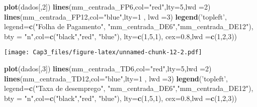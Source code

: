 \documentclass[]{article}
\newenvironment{Shaded}{\begin{snugshade}}{\end{snugshade}}
\newcommand{\DataTypeTok}[1]{\textcolor[rgb]{0.13,0.29,0.53}{#1}}
\newcommand{\DecValTok}[1]{\textcolor[rgb]{0.00,0.00,0.81}{#1}}
\newcommand{\FloatTok}[1]{\textcolor[rgb]{0.00,0.00,0.81}{#1}}
\newcommand{\KeywordTok}[1]{\textcolor[rgb]{0.13,0.29,0.53}{\textbf{#1}}}
\newcommand{\NormalTok}[1]{#1}
\newcommand{\StringTok}[1]{\textcolor[rgb]{0.31,0.60,0.02}{#1}}
\begin{document}
\begin{Shaded}
\begin{Highlighting}[]
\KeywordTok{plot}\NormalTok{(dados[,}\DecValTok{2}\NormalTok{])}
\KeywordTok{lines}\NormalTok{(mm_centrada_FP6,}\DataTypeTok{col=}\StringTok{"red"}\NormalTok{,}\DataTypeTok{lty=}\DecValTok{5}\NormalTok{,}\DataTypeTok{lwd =}\DecValTok{2}\NormalTok{)}
\KeywordTok{lines}\NormalTok{(mm_centrada_FP12,}\DataTypeTok{col=}\StringTok{"blue"}\NormalTok{,}\DataTypeTok{lty=}\DecValTok{1}\NormalTok{ , }\DataTypeTok{lwd =}\DecValTok{3}\NormalTok{)}
\KeywordTok{legend}\NormalTok{(}\StringTok{'topleft'}\NormalTok{, }\DataTypeTok{legend=}\KeywordTok{c}\NormalTok{(}\StringTok{"Folha de Pagamento"}\NormalTok{, }\StringTok{"mm_centrada_DE6"}\NormalTok{,}\StringTok{"mm_centrada_DE12"}\NormalTok{),}
\DataTypeTok{bty =} \StringTok{"n"}\NormalTok{,}\DataTypeTok{col=}\KeywordTok{c}\NormalTok{(}\StringTok{"black"}\NormalTok{,}\StringTok{"red"}\NormalTok{, }\StringTok{"blue"}\NormalTok{), }\DataTypeTok{lty=}\KeywordTok{c}\NormalTok{(}\DecValTok{1}\NormalTok{,}\DecValTok{5}\NormalTok{,}\DecValTok{1}\NormalTok{), }\DataTypeTok{cex=}\FloatTok{0.8}\NormalTok{,}\DataTypeTok{lwd =}\KeywordTok{c}\NormalTok{(}\DecValTok{1}\NormalTok{,}\DecValTok{2}\NormalTok{,}\DecValTok{3}\NormalTok{))}
\end{Highlighting}
\end{Shaded}

\texttt{[image: Cap3\_files/figure-latex/unnamed-chunk-12-2.pdf]}

\begin{Shaded}
\begin{Highlighting}[]
\KeywordTok{plot}\NormalTok{(dados[,}\DecValTok{3}\NormalTok{])}
\KeywordTok{lines}\NormalTok{(mm_centrada_TD6,}\DataTypeTok{col=}\StringTok{"red"}\NormalTok{,}\DataTypeTok{lty=}\DecValTok{5}\NormalTok{,}\DataTypeTok{lwd =}\DecValTok{2}\NormalTok{)}
\KeywordTok{lines}\NormalTok{(mm_centrada_TD12,}\DataTypeTok{col=}\StringTok{"blue"}\NormalTok{,}\DataTypeTok{lty=}\DecValTok{1}\NormalTok{ , }\DataTypeTok{lwd =}\DecValTok{3}\NormalTok{)}
\KeywordTok{legend}\NormalTok{(}\StringTok{'topleft'}\NormalTok{, }\DataTypeTok{legend=}\KeywordTok{c}\NormalTok{(}\StringTok{"Taxa de desemprego"}\NormalTok{, }\StringTok{"mm_centrada_DE6"}\NormalTok{,}\StringTok{"mm_centrada_DE12"}\NormalTok{),}
\DataTypeTok{bty =} \StringTok{"n"}\NormalTok{,}\DataTypeTok{col=}\KeywordTok{c}\NormalTok{(}\StringTok{"black"}\NormalTok{,}\StringTok{"red"}\NormalTok{, }\StringTok{"blue"}\NormalTok{), }\DataTypeTok{lty=}\KeywordTok{c}\NormalTok{(}\DecValTok{1}\NormalTok{,}\DecValTok{5}\NormalTok{,}\DecValTok{1}\NormalTok{), }\DataTypeTok{cex=}\FloatTok{0.8}\NormalTok{,}\DataTypeTok{lwd =}\KeywordTok{c}\NormalTok{(}\DecValTok{1}\NormalTok{,}\DecValTok{2}\NormalTok{,}\DecValTok{3}\NormalTok{))}
\end{Highlighting}
\end{Shaded}
\end{document}
